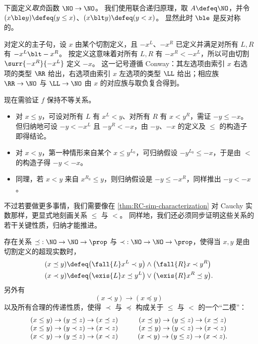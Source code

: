 \begin{eg}
  下面定义\emph{取负}函数 $\NO\to\NO$。
  我们使用联合递归原理，取 $A\defeq\NO$，并令 $(x\ble y)\defeq (y\le x)$、$(x\blt y)\defeq (y< x)$。
  显然此时 $\ble$ 是反对称的。

  对定义的主子句，设 $x$ 由某个切割定义，且 $-x^L$、$-x^R$ 已定义并满足对所有 $L,R$ 有 $-x^L \blt -x^R$。
  按定义这意味着对所有 $L,R$ 有 $-x^R< -x^L$，所以可由切割 $\surr{-x^R}{-x^L}$ 定义 $-x$。
  这一记号遵循 Conway：其左选项由索引 $x$ 右选项的类型 $\RR$ 给出，右选项由索引 $x$ 左选项的类型 $\LL$ 给出；相应族 $\RR\to\NO$ 与 $\LL\to\NO$ 由 $x$ 的对应族与取负复合得到。

  现在需验证 $f$ 保持不等关系。
  \begin{itemize}
  \item 对 $x\le y$，可设对所有 $L$ 有 $x^L<y$、对所有 $R$ 有 $x < y^R$，需证 $-y\le -x$。
    但归纳地可设 $-y <-x^L$ 且 $-y^R<-x$，由 $-y$、$-x$ 的定义及 $\le$ 的构造子即得结论。
  \item 对 $x<y$，第一种情形来自某个 $x\le y^{L_0}$，可归纳假设 $-y^{L_0} \le -x$，于是由 $<$ 的构造子得 $-y<-x$。
  \item 同理，若 $x<y$ 来自 $x^{R_0}\le y$，则归纳假设是 $-y \le -x^R$，同样推出 $-y<-x$。
  \end{itemize}
\end{eg}

不过若要做更多事情，我们需要像在 \cref{thm:RC-sim-characterization} 对 Cauchy 实数那样，更显式地刻画关系 $\le$ 与 $<$。
同样地，我们还必须同步证明这些关系的若干关键性质，归纳才能推进。

\begin{thm}\label{defn:No-codes}
  存在关系 $\mathord\preceq:\NO\to\NO\to\prop$ 与 $\mathord\prec:\NO\to\NO\to\prop$，使得当 $x,y$ 是由切割定义的超现实数时，
  \begin{align*}
    (x\preceq y) &\defeq
    \big(\fall{L} x^L\prec y\big) \land \big(\fall{R} x\prec y^R\big)\\
    (x\prec y) &\defeq
    \big(\exis{L} x\preceq y^L\big) \lor \big(\exis{R} x^R \preceq y\big).
  \end{align*}
  另外有
  \begin{equation}\label{eq:NO-codes-unstrict}
    (x\prec y) \to (x\preceq y)
  \end{equation}
  以及所有合理的传递性质，使得 $\prec$ 与 $\preceq$ 构成关于 $\le$ 与 $<$ 的一个“二模”：
  \begin{equation}\label{eq:NO-codes-transitivity}
    \begin{array}{c@{\hspace{1cm}}c}
      (x \le y) \to (y\preceq z) \to (x\preceq z) &
      (x \preceq y) \to (y\le z) \to (x\preceq z) \\
      (x \le y) \to (y\prec z) \to (x\prec z) &
      (x \preceq y) \to (y< z) \to (x\prec z) \\
      (x < y) \to (y\preceq z) \to (x\prec z) &
      (x \prec y) \to (y\le z) \to (x\prec z).
  \end{array}
  \end{equation}
\end{thm}

